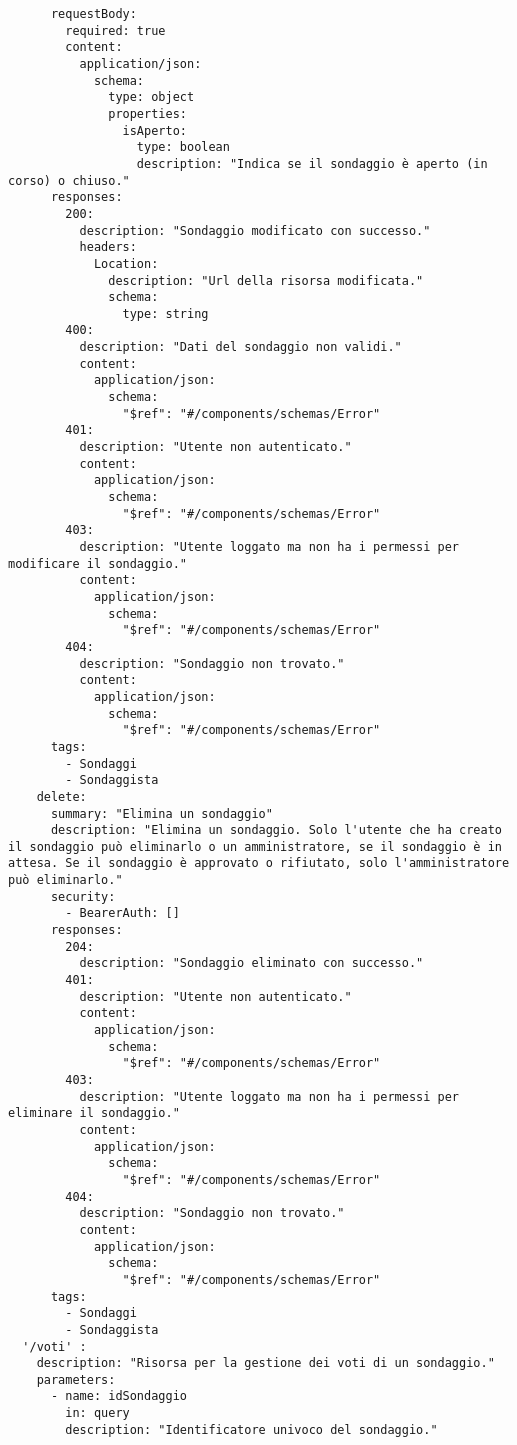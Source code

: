 \begin{verbatim}
      requestBody:
        required: true
        content:
          application/json:
            schema:
              type: object
              properties:
                isAperto:
                  type: boolean
                  description: "Indica se il sondaggio è aperto (in corso) o chiuso."
      responses:
        200:
          description: "Sondaggio modificato con successo."
          headers:
            Location:
              description: "Url della risorsa modificata."
              schema:
                type: string
        400:
          description: "Dati del sondaggio non validi."
          content:
            application/json:
              schema:
                "$ref": "#/components/schemas/Error"
        401:
          description: "Utente non autenticato."
          content:
            application/json:
              schema:
                "$ref": "#/components/schemas/Error"
        403:
          description: "Utente loggato ma non ha i permessi per modificare il sondaggio."
          content:
            application/json:
              schema:
                "$ref": "#/components/schemas/Error"
        404:
          description: "Sondaggio non trovato."
          content:
            application/json:
              schema:
                "$ref": "#/components/schemas/Error"
      tags:
        - Sondaggi
        - Sondaggista
    delete:
      summary: "Elimina un sondaggio"
      description: "Elimina un sondaggio. Solo l'utente che ha creato il sondaggio può eliminarlo o un amministratore, se il sondaggio è in attesa. Se il sondaggio è approvato o rifiutato, solo l'amministratore può eliminarlo."
      security:
        - BearerAuth: []
      responses:
        204:
          description: "Sondaggio eliminato con successo."
        401:
          description: "Utente non autenticato."
          content:
            application/json:
              schema:
                "$ref": "#/components/schemas/Error"
        403:
          description: "Utente loggato ma non ha i permessi per eliminare il sondaggio."
          content:
            application/json:
              schema:
                "$ref": "#/components/schemas/Error"
        404:
          description: "Sondaggio non trovato."
          content:
            application/json:
              schema:
                "$ref": "#/components/schemas/Error"
      tags:
        - Sondaggi
        - Sondaggista
  '/voti' :
    description: "Risorsa per la gestione dei voti di un sondaggio."
    parameters:
      - name: idSondaggio
        in: query
        description: "Identificatore univoco del sondaggio."

\end{verbatim}
